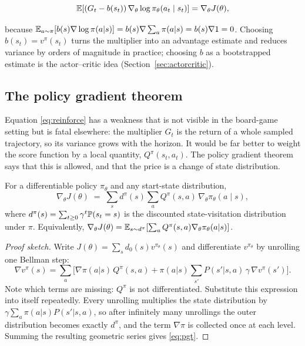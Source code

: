 \begin{equation}
\mathbb{E}\!\left[ (G_t - b(s_t))\, \nabla_\theta \log \pi_\theta(a_t \mid s_t) \right]
= \nabla_\theta J(\theta),
\label{eq:baseline}
\end{equation}

because $\mathbb{E}_{a \sim \pi}[b(s) \nabla \log \pi(a|s)] = b(s) \nabla \sum_a \pi(a|s)
= b(s) \nabla 1 = 0$. Choosing $b(s_t) = v^{\pi}(s_t)$ turns the multiplier into
an advantage estimate and reduces variance by orders of magnitude in practice;
choosing $b$ as a bootstrapped estimate is the actor--critic idea
(Section~\ref{sec:actorcritic}).

\subsection{The policy gradient theorem}
\label{sec:pgt}

Equation \eqref{eq:reinforce} has a weakness that is not visible in the board-game
setting but is fatal elsewhere: the multiplier $G_t$ is the return of a whole
sampled trajectory, so its variance grows with the horizon. It would be far
better to weight the score function by a local quantity, $Q^\pi(s_t,a_t)$. The
policy gradient theorem says that this is allowed, and that the price is a
change of state distribution.

\begin{theorem}
\label{thm:pgt}
For a differentiable policy $\pi_\theta$ and any start-state distribution,
\begin{equation}
\nabla_\theta J(\theta) \;=\;
\sum_{s} d^{\pi}(s) \sum_{a} Q^{\pi}(s,a)\, \nabla_\theta \pi_\theta(a \mid s),
\label{eq:pgt}
\end{equation}
where $d^{\pi}(s) = \sum_{t\ge 0} \gamma^t \mathbb{P}(s_t = s)$ is the
discounted state-visitation distribution under $\pi$.
Equivalently,
$\nabla_\theta J(\theta) = \mathbb{E}_{s \sim d^\pi}
\!\left[\sum_a Q^\pi(s,a) \nabla_\theta \pi_\theta(a|s)\right]$.
\end{theorem}

\begin{proof}[Proof sketch]
Write $J(\theta) = \sum_s d_0(s) v^{\pi_\theta}(s)$ and differentiate
$v^{\pi_\theta}$ by unrolling one Bellman step:
\[
\nabla v^{\pi}(s)
= \sum_a \Big[ \nabla \pi(a|s)\, Q^{\pi}(s,a)
  + \pi(a|s) \sum_{s'} P(s'|s,a)\, \gamma\, \nabla v^{\pi}(s') \Big].
\]
Note which terms are missing: $Q^\pi$ is not differentiated. Substitute this
expression into itself repeatedly. Every unrolling multiplies the state
distribution by $\gamma \sum_a \pi(a|s) P(s'|s,a)$, so after infinitely many
unrollings the outer distribution becomes exactly $d^\pi$, and the term
$\nabla \pi$ is collected once at each level. Summing the resulting geometric
series gives \eqref{eq:pgt}.
\end{proof}

